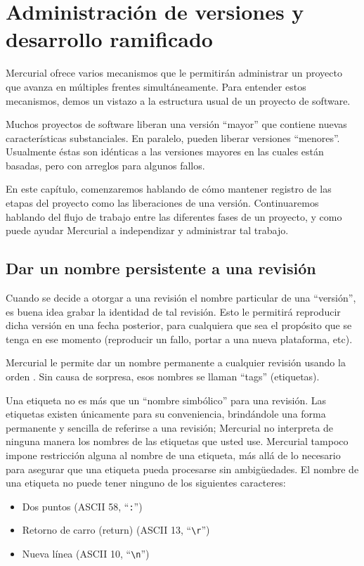 \chapter{Administración de versiones y desarrollo ramificado}
\label{chap:branch}

Mercurial ofrece varios mecanismos que le permitirán administrar un
proyecto que avanza en múltiples frentes simultáneamente. Para
entender estos mecanismos, demos un vistazo a la estructura usual de
un proyecto de software.

Muchos proyectos de software liberan una versión ``mayor'' que contiene
nuevas características substanciales.  En paralelo, pueden liberar
versiones ``menores''.   Usualmente éstas son idénticas a las
versiones mayores en las cuales están basadas, pero con arreglos para
algunos fallos.

En este capítulo, comenzaremos hablando de cómo mantener registro de
las etapas del proyecto como las liberaciones de una
versión. Continuaremos hablando del flujo de trabajo entre las
diferentes fases de un proyecto, y como puede ayudar Mercurial a
independizar y administrar tal trabajo.

\section{Dar un nombre persistente a una revisión}

Cuando se decide a otorgar a una revisión el nombre particular de una
``versión'', es buena idea grabar la identidad de tal revisión.
Esto le permitirá reproducir dicha versión en una fecha posterior,
para cualquiera que sea el 
propósito que se tenga en ese momento (reproducir un fallo, portar
a una nueva plataforma, etc).

Mercurial le permite dar un nombre permanente a cualquier revisión
usando la orden .  Sin causa de sorpresa, esos nombres se llaman
``tags'' (etiquetas).

Una etiqueta no es más que un ``nombre simbólico'' para una revisión.  Las
etiquetas existen únicamente para su conveniencia, brindándole una forma
permanente y sencilla de referirse a una revisión; Mercurial no
interpreta de ninguna manera los nombres de las etiquetas que usted use.
Mercurial tampoco impone restricción alguna al nombre de una etiqueta, más
allá de lo necesario para asegurar que una etiqueta pueda procesarse sin
ambigüedades. El nombre de una etiqueta no puede tener ninguno de los
siguientes caracteres:
\begin{itemize}
\item Dos puntos (ASCII 58, ``\texttt{:}'')
\item Retorno de carro (return) (ASCII 13, ``\Verb+\r+'')
\item Nueva línea (ASCII 10, ``\Verb+\n+'')
\end{itemize}

